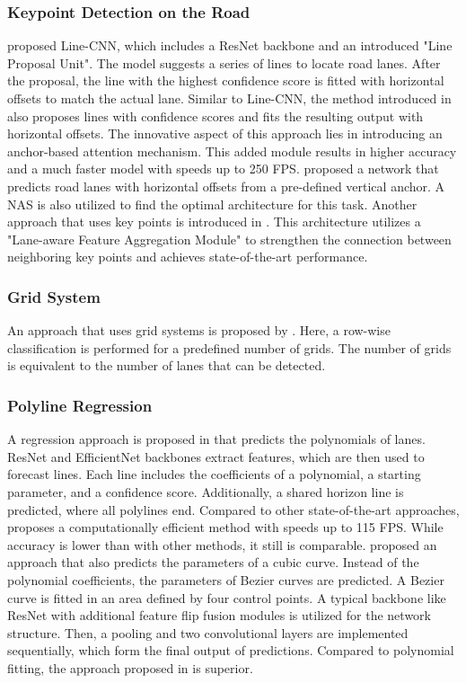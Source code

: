 \subsubsection{Keypoint Detection on the Road}

\cite{LineCNN2020} proposed Line-CNN, which includes a ResNet backbone and an introduced "Line Proposal Unit".
The model suggests a series of lines to locate road lanes.
After the proposal, the line with the highest confidence score is fitted with horizontal offsets to match the actual lane.
Similar to Line-CNN, the method introduced in \cite{KeepEyesOnLane2021} also proposes lines with confidence scores and fits the resulting output with horizontal offsets.
The innovative aspect of this approach lies in introducing an anchor-based attention mechanism.
This added module results in higher accuracy and a much faster model with speeds up to 250 \ac{FPS}.
\cite{CurveLaneNAS2020} proposed a network that predicts road lanes with horizontal offsets from a pre-defined vertical anchor.
A \ac{NAS} is also utilized to find the optimal architecture for this task.
Another approach that uses key points is introduced in \cite{GANet2022}.
This architecture utilizes a "Lane-aware Feature Aggregation Module" to strengthen the connection between neighboring key points and achieves state-of-the-art performance.

\subsubsection{Grid System}

An approach that uses grid systems is proposed by \cite{laneDetectionGrid2020}.
Here, a row-wise classification is performed for a predefined number of grids.
The number of grids is equivalent to the number of lanes that can be detected.

\subsubsection{Polyline Regression}

A regression approach is proposed in \cite{PolyLaneNetRoad2021} that predicts the polynomials of lanes.
ResNet and EfficientNet backbones extract features, which are then used to forecast lines.
Each line includes the coefficients of a polynomial, a starting parameter, and a confidence score.
Additionally, a shared horizon line is predicted, where all polylines end.
Compared to other state-of-the-art approaches, \cite{PolyLaneNetRoad2021} proposes a computationally efficient method with speeds up to 115 \ac{FPS}.
While accuracy is lower than with other methods, it still is comparable.
\cite{DetectingLanesWithBezierCurves2023} proposed an approach that also predicts the parameters of a cubic curve.
Instead of the polynomial coefficients, the parameters of Bezier curves are predicted.
A Bezier curve is fitted in an area defined by four control points.
A typical backbone like ResNet with additional feature flip fusion modules is utilized for the network structure.
Then, a pooling and two convolutional layers are implemented sequentially, which form the final output of predictions.
Compared to polynomial fitting, the approach proposed in \cite{DetectingLanesWithBezierCurves2023} is superior.

